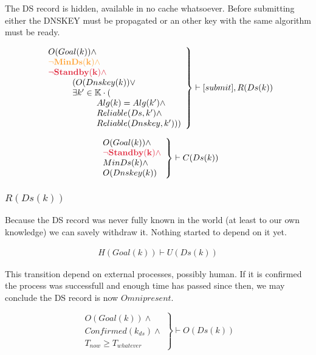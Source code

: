 \documentclass[twoside, a4paper]{article}
\newcommand{\highlightMinSig}[1]{\textcolor{MinSig}{\bf{#1}}}
\newcommand{\highlightStandby}[1]{\textcolor{Stdby}{\bf{#1}}}
\newcommand{\mathbox}[1]{#1}
\begin{document}
\mathbox{
	
	The DS record is hidden, available in no cache whatsoever.
	Before submitting either the DNSKEY must be propagated or an other 
	key with the same algorithm must be ready.
	
	\begin{equation}
		\left.
		\begin{array}{l}
			O(Goal(k)) \wedge \\
\highlightMinSig{			\neg MinDs(k) \wedge }\\
\highlightStandby{			\neg Standby(k) \wedge }\\
\hskip 1cm		(O(Dnskey(k)) \vee \\
\hskip 1cm		\exists k' \in \mathbb{K} \cdot ( \\
\hskip 2cm			Alg(k)=Alg(k') \wedge \\
\hskip 2cm			Reliable(Ds, k') \wedge \\
\hskip 2cm			Reliable(Dnskey, k')))
		\end{array}
		\right\}\vdash [submit], R(Ds(k)) 
	\end{equation}
	
\highlightMinSig{
	\begin{equation}
		\left.
		\begin{array}{l}
			O(Goal(k)) \wedge \\
\highlightStandby{			\neg Standby(k) \wedge }\\
			MinDs(k) \wedge \\
			O(Dnskey(k))
		\end{array}
		\right\}\vdash C(Ds(k))
	\end{equation}
	}
}

\subsubsection{$R(Ds(k))$}

\mathbox{
	
	Because the DS record was never fully known in the world (at 
	least to our own knowledge) we can savely withdraw it. Nothing 
	started to depend on it yet.
	
	\begin{equation}
		\begin{split}
			H(Goal(k)) \vdash U(Ds(k))
		\end{split}
	\end{equation}

	This transition depend on external processes, possibly human. If it 
	is confirmed the process was successfull and enough time has passed
	since then, we may conclude the DS record is now $Omnipresent$.
	
	\begin{equation}
		\left.
		\begin{array}{l}
			O(Goal(k)) \wedge \\
			Confirmed(k_{ds}) \wedge \\
			T_{now} \geq T_{whatever}
		\end{array}
		\right\}\vdash O(Ds(k))
	\end{equation}
}
\end{document}
